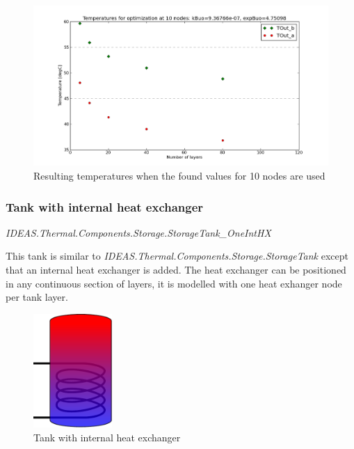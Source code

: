 \begin{figure}%
\begin{left}
\includegraphics[width=\columnwidth]{Thermal/images/Validation_Vitocell100V390l_ChargingTimeEndTemperatures_nonlin_10nodes.png}%
\caption{Resulting temperatures when the found values for 10 nodes are used}%
\label{tankinternal}%
\end{left}
\end{figure}

\subsubsection{Tank with internal heat exchanger}

\emph{IDEAS.Thermal.Components.Storage.StorageTank_OneIntHX}

\vspace{6mm}

This tank is similar to \emph{IDEAS.Thermal.Components.Storage.StorageTank} except that an internal heat exchanger is added.  The heat exchanger can be positioned in any continuous section of layers, it is modelled with one heat exhanger node per tank layer. 

\begin{figure}%
\begin{left}
\includegraphics[width=3cm]{Thermal/images/HydraulicScheme.pdf}%
\caption{Tank with internal heat exchanger}%
\label{tankinternal}%
\end{left}
\end{figure}

